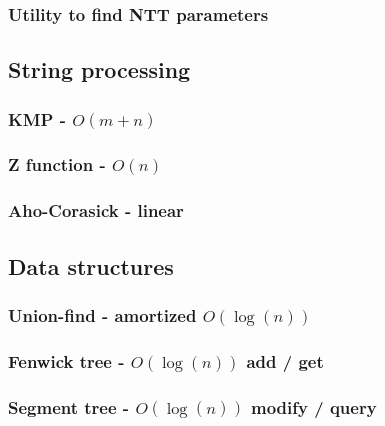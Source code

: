 \documentclass[landscape,a4paper,twocolumn,10pt]{report}
\begin{document}
\subsubsection{Utility to find NTT parameters}




\subsection*{String processing}
\label{string}

\subsubsection{KMP - $O(m+n)$}


\subsubsection{Z function - $O(n)$}


\subsubsection{Aho-Corasick - linear}



\subsection*{Data structures}
\label{datastruct}

\subsubsection{Union-find - amortized $O(\log(n))$}


\subsubsection{Fenwick tree - $O(\log(n))$ add / get}


\subsubsection{Segment tree - $O(\log(n))$ modify / query}

\end{document}
